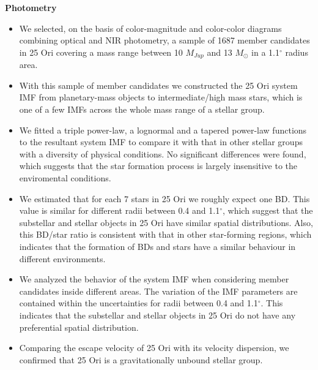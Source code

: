 \documentclass[12pt]{article}
\begin{document}
{\bf Photometry}
\begin{itemize}
	\item We selected, on the basis of color-magnitude and color-color diagrams combining optical and NIR photometry, a sample of 1687 member candidates in 25 Ori covering a mass range between 10 $M_{Jup}$ and 13 $M_\odot$ in a 1.1$^\circ$ radius area.
	\item With this sample of member candidates we constructed the 25 Ori system IMF from planetary-mass objects to intermediate/high mass stars, which is one of a few IMFs across the whole mass range of a stellar group.
	\item We fitted a triple power-law, a lognormal and a tapered power-law functions to the resultant system IMF to compare it with that in other stellar groups with a diversity of physical conditions. No significant differences were found, which suggests that the star formation process is largely insensitive to the enviromental conditions.
	\item We estimated that for each 7 stars in 25 Ori we roughly expect one BD. This value is similar for different radii between 0.4 and 1.1$^\circ$, which suggest that the substellar and stellar objects in 25 Ori have similar spatial distributions. Also, this BD/star ratio is consistent with that in other star-forming regions, which indicates that the formation of BDs and stars have a similar behaviour in different environments.
	\item We analyzed the behavior of the system IMF when considering member candidates inside different areas. The variation of the IMF parameters are contained within the uncertainties for radii between 0.4 and 1.1$^\circ$. This indicates that the substellar and stellar objects in 25 Ori do not have any preferential spatial distribution.
	\item Comparing the escape velocity of 25 Ori with its velocity dispersion, we confirmed that 25 Ori is a gravitationally unbound stellar group.
\end{itemize}
\end{document}
